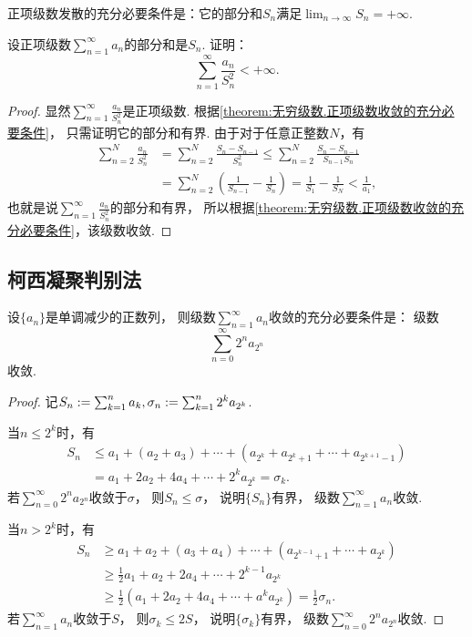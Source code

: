 \begin{proposition}
正项级数发散的充分必要条件是：它的部分和\(S_n\)满足\(\lim_{n\to\infty} S_n = +\infty\).
\end{proposition}

\begin{example}
设正项级数\(\sum_{n=1}^\infty a_n\)的部分和是\(S_n\).
证明：\[
	\sum_{n=1}^\infty \frac{a_n}{S_n^2} < +\infty.
\]
\begin{proof}
显然\(\sum_{n=1}^\infty \frac{a_n}{S_n^2}\)是正项级数.
根据\cref{theorem:无穷级数.正项级数收敛的充分必要条件}，
只需证明它的部分和有界.
由于对于任意正整数\(N\)，有\begin{align*}
	\sum_{n=2}^N \frac{a_n}{S_n^2}
	&= \sum_{n=2}^N \frac{S_n-S_{n-1}}{S_n^2}
	\leq \sum_{n=2}^N \frac{S_n-S_{n-1}}{S_{n-1} S_n} \\
	&= \sum_{n=2}^N \left(
			\frac{1}{S_{n-1}} - \frac{1}{S_n}
		\right)
	= \frac{1}{S_1} - \frac{1}{S_N}
	< \frac{1}{a_1},
\end{align*}
也就是说\(\sum_{n=1}^\infty \frac{a_n}{S_n^2}\)的部分和有界，
所以根据\cref{theorem:无穷级数.正项级数收敛的充分必要条件}，该级数收敛.
\end{proof}
\end{example}

\subsection{柯西凝聚判别法}
\begin{theorem}\label{theorem:无穷级数.柯西凝聚判别法}
设\(\{a_n\}\)是单调减少的正数列，
则级数\(\sum_{n=1}^\infty a_n\)收敛的充分必要条件是：
级数\[
	\sum_{n=0}^\infty 2^n a_{2^n}
\]收敛.
\begin{proof}
记\(S_n := \sum_{k=1}^n a_k,
\sigma_n := \sum_{k=1}^n 2^k a_{2^k}\).

当\(n \leq 2^k\)时，有\begin{align*}
	S_n &\leq a_1 + (a_2 + a_3)
	+ \dotsb + (a_{2^k} + a_{2^k+1} + \dotsb + a_{2^{k+1}-1}) \\
	&= a_1 + 2 a_2 + 4 a_4 + \dotsb + 2^k a_{2^k}
	= \sigma_k.
\end{align*}
若\(\sum_{n=0}^\infty 2^n a_{2^n}\)收敛于\(\sigma\)，
则\(S_n \leq \sigma\)，
说明\(\{S_n\}\)有界，
级数\(\sum_{n=1}^\infty a_n\)收敛.

当\(n > 2^k\)时，有\begin{align*}
	S_n &\geq a_1 + a_2 + (a_3 + a_4)
	+ \dotsb + (a_{2^{k-1}+1} + \dotsb + a_{2^k}) \\
	&\geq \frac12 a_1 + a_2 + 2 a_4 + \dotsb + 2^{k-1} a_{2^k} \\
	&\geq \frac12 (a_1 + 2 a_2 + 4 a_4 + \dotsb + a^k a_{2^k})
	= \frac12 \sigma_n.
\end{align*}
若\(\sum_{n=1}^\infty a_n\)收敛于\(S\)，
则\(\sigma_k \leq 2 S\)，
说明\(\{\sigma_k\}\)有界，
级数\(\sum_{n=0}^\infty 2^n a_{2^n}\)收敛.
\end{proof}
\end{theorem}

